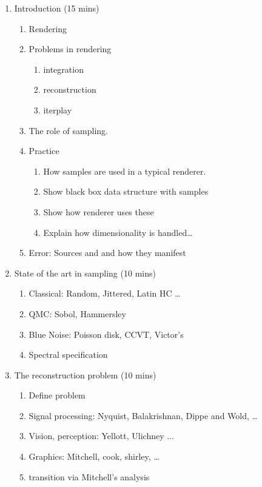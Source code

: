 %
%

\begin{enumerate}
	\item Introduction (15 mins)
	\begin{enumerate}
	\itemsep-0.4em	
		\item Rendering
		\item Problems in rendering
		\begin{enumerate}%
		\itemsep-0.6em	
			\item integration
			\item reconstruction
			\item iterplay
		\end{enumerate}	
		\item The role of sampling.
		\item Practice
		\begin{enumerate}
		\itemsep-0.6em
			\item How samples are used in a typical renderer. 
			\item Show black box data structure with samples
			\item Show how renderer uses these
			\item Explain how dimensionality is handled…
		\end{enumerate}
		\item Error: Sources and and how they manifest
	\end{enumerate}
	\item State of the art in sampling (10 mins) 
	\begin{enumerate}
	\itemsep-0.4em	
		\item Classical: Random, Jittered, Latin HC …
		\item QMC: Sobol, Hammersley 
		\item Blue Noise: Poisson disk, CCVT, Victor’s 
		\item Spectral specification
	\end{enumerate}
	\item The reconstruction problem (10 mins)
	\begin{enumerate}
	\itemsep-0.4em
		\item Define problem
		\item Signal processing: Nyquist, Balakrishnan, Dippe and Wold, …
		\item Vision, perception: Yellott, Ulichney ...
		\item Graphics: Mitchell, cook, shirley, …
		\item transition via Mitchell’s analysis

\end{enumerate}
\end{enumerate}
